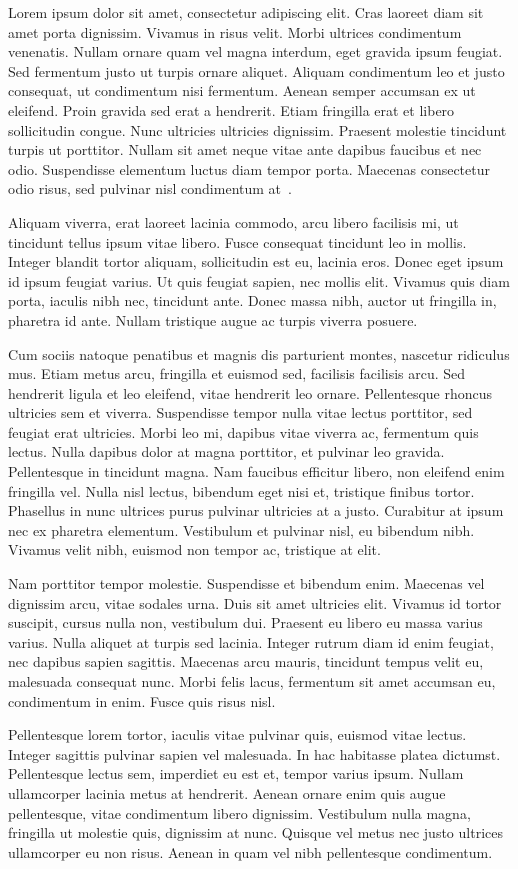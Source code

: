 \documentclass[../thesis.tex]{subfiles}
\begin{document}
 Lorem ipsum dolor sit amet, consectetur adipiscing elit. Cras laoreet diam sit amet porta dignissim. Vivamus in risus velit. Morbi ultrices condimentum venenatis. Nullam ornare quam vel magna interdum, eget gravida ipsum feugiat. Sed fermentum justo ut turpis ornare aliquet. Aliquam condimentum leo et justo consequat, ut condimentum nisi fermentum. Aenean semper accumsan ex ut eleifend. Proin gravida sed erat a hendrerit. Etiam fringilla erat et libero sollicitudin congue. Nunc ultricies ultricies dignissim. Praesent molestie tincidunt turpis ut porttitor. Nullam sit amet neque vitae ante dapibus faucibus et nec odio. Suspendisse elementum luctus diam tempor porta. Maecenas consectetur odio risus, sed pulvinar nisl condimentum at~\cite{doucet2009tutorial}.

Aliquam viverra, erat laoreet lacinia commodo, arcu libero facilisis mi, ut tincidunt tellus ipsum vitae libero. Fusce consequat tincidunt leo in mollis. Integer blandit tortor aliquam, sollicitudin est eu, lacinia eros. Donec eget ipsum id ipsum feugiat varius. Ut quis feugiat sapien, nec mollis elit. Vivamus quis diam porta, iaculis nibh nec, tincidunt ante. Donec massa nibh, auctor ut fringilla in, pharetra id ante. Nullam tristique augue ac turpis viverra posuere.

Cum sociis natoque penatibus et magnis dis parturient montes, nascetur ridiculus mus. Etiam metus arcu, fringilla et euismod sed, facilisis facilisis arcu. Sed hendrerit ligula et leo eleifend, vitae hendrerit leo ornare. Pellentesque rhoncus ultricies sem et viverra. Suspendisse tempor nulla vitae lectus porttitor, sed feugiat erat ultricies. Morbi leo mi, dapibus vitae viverra ac, fermentum quis lectus. Nulla dapibus dolor at magna porttitor, et pulvinar leo gravida. Pellentesque in tincidunt magna. Nam faucibus efficitur libero, non eleifend enim fringilla vel. Nulla nisl lectus, bibendum eget nisi et, tristique finibus tortor. Phasellus in nunc ultrices purus pulvinar ultricies at a justo. Curabitur at ipsum nec ex pharetra elementum. Vestibulum et pulvinar nisl, eu bibendum nibh. Vivamus velit nibh, euismod non tempor ac, tristique at elit.

Nam porttitor tempor molestie. Suspendisse et bibendum enim. Maecenas vel dignissim arcu, vitae sodales urna. Duis sit amet ultricies elit. Vivamus id tortor suscipit, cursus nulla non, vestibulum dui. Praesent eu libero eu massa varius varius. Nulla aliquet at turpis sed lacinia. Integer rutrum diam id enim feugiat, nec dapibus sapien sagittis. Maecenas arcu mauris, tincidunt tempus velit eu, malesuada consequat nunc. Morbi felis lacus, fermentum sit amet accumsan eu, condimentum in enim. Fusce quis risus nisl.

Pellentesque lorem tortor, iaculis vitae pulvinar quis, euismod vitae lectus. Integer sagittis pulvinar sapien vel malesuada. In hac habitasse platea dictumst. Pellentesque lectus sem, imperdiet eu est et, tempor varius ipsum. Nullam ullamcorper lacinia metus at hendrerit. Aenean ornare enim quis augue pellentesque, vitae condimentum libero dignissim. Vestibulum nulla magna, fringilla ut molestie quis, dignissim at nunc. Quisque vel metus nec justo ultrices ullamcorper eu non risus. Aenean in quam vel nibh pellentesque condimentum.
\end{document}
